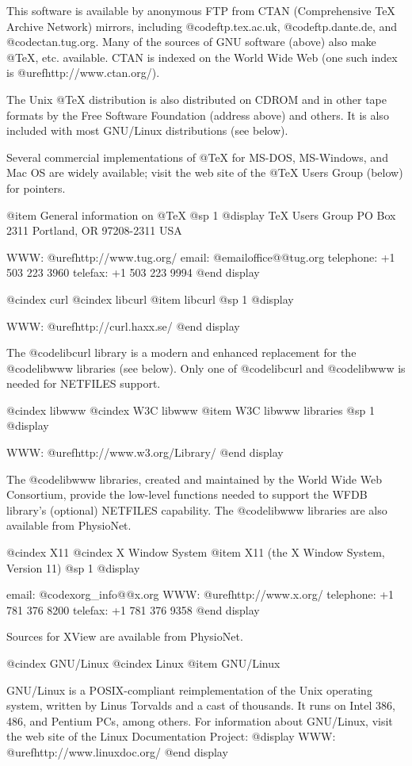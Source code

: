 {{{{{{{{This software is available by anonymous FTP from CTAN (Comprehensive TeX
Archive Network) mirrors, including @code{ftp.tex.ac.uk}, @code{ftp.dante.de},
and @code{ctan.tug.org}.  Many of the sources of GNU software (above) also make
@TeX{}, etc. available.  CTAN is indexed on the World Wide Web (one such index
is @uref{http://www.ctan.org/}).

The Unix @TeX{} distribution is also distributed on CDROM and in other tape
formats by the Free Software Foundation (address above) and others.  It is
also included with most GNU/Linux distributions (see below).

Several commercial implementations of @TeX{} for MS-DOS, MS-Windows, and Mac OS
are widely available;  visit the web site of the @TeX{} Users Group (below) for
pointers.

@item General information on @TeX{}
@sp 1
@display
TeX Users Group
PO Box 2311
Portland, OR 97208-2311 USA

WWW: @uref{http://www.tug.org/}
email: @email{office@@tug.org}
telephone: +1 503 223 3960
telefax: +1 503 223 9994
@end display

@cindex curl
@cindex libcurl
@item libcurl
@sp 1
@display

WWW: @uref{http://curl.haxx.se/}
@end display

The @code{libcurl} library is a modern and enhanced replacement for the
@code{libwww} libraries (see below).  Only one of @code{libcurl} and
@code{libwww} is needed for NETFILES support.

@cindex libwww
@cindex W3C libwww
@item W3C libwww libraries
@sp 1
@display

WWW: @uref{http://www.w3.org/Library/}
@end display

The @code{libwww} libraries, created and maintained by the World Wide
Web Consortium, provide the low-level functions needed to support
the WFDB library's (optional) NETFILES capability.  The @code{libwww}
libraries are also available from PhysioNet.

@cindex X11
@cindex X Window System
@item X11 (the X Window System, Version 11)
@sp 1
@display

email: @code{xorg_info@@x.org}
WWW: @uref{http://www.x.org/}
telephone: +1 781 376 8200
telefax: +1 781 376 9358
@end display

Sources for XView are available from PhysioNet.

@cindex GNU/Linux
@cindex Linux
@item GNU/Linux

GNU/Linux is a POSIX-compliant reimplementation of the Unix operating system,
written by Linus Torvalds and a cast of thousands.  It runs on Intel 386,
486, and Pentium PCs, among others.  For information about GNU/Linux, visit
the web site of the Linux Documentation Project:
@display
WWW: @uref{http://www.linuxdoc.org/}
@end display

}}}}}}}}
